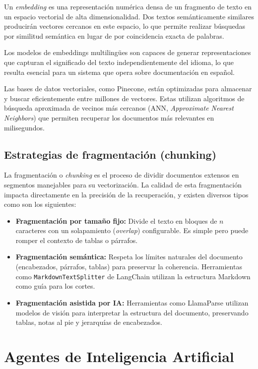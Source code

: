 \documentclass[12pt,a4paper,oneside]{report}
\begin{document}
Un \textit{embedding} es una representación numérica densa de un fragmento de texto en un espacio vectorial de alta dimensionalidad. Dos textos semánticamente similares producirán vectores cercanos en este espacio, lo que permite realizar búsquedas por similitud semántica en lugar de por coincidencia exacta de palabras.

Los modelos de embeddings multilingües son capaces de generar representaciones que capturan el significado del texto independientemente del idioma, lo que resulta esencial para un sistema que opera sobre documentación en español.

Las bases de datos vectoriales, como Pinecone, están optimizadas para almacenar y buscar eficientemente entre millones de vectores. Estas utilizan algoritmos de búsqueda aproximada de vecinos más cercanos (ANN, \textit{Approximate Nearest Neighbors}) que permiten recuperar los documentos más relevantes en milisegundos.

\subsection{Estrategias de fragmentación (chunking)}

La fragmentación o \textit{chunking} es el proceso de dividir documentos extensos en segmentos manejables para su vectorización. La calidad de esta fragmentación impacta directamente en la precisión de la recuperación, y existen diversos tipos como son los siguientes:

\begin{itemize}
    \item \textbf{Fragmentación por tamaño fijo:} Divide el texto en bloques de $n$ caracteres con un solapamiento (\textit{overlap}) configurable. Es simple pero puede romper el contexto de tablas o párrafos.
    \item \textbf{Fragmentación semántica:} Respeta los límites naturales del documento (encabezados, párrafos, tablas) para preservar la coherencia. Herramientas como \texttt{Mark\-down\-Text\-Split\-ter} de LangChain utilizan la estructura Markdown como guía para los cortes.
    \item \textbf{Fragmentación asistida por IA:} Herramientas como LlamaParse utilizan modelos de visión para interpretar la estructura del documento, preservando tablas, notas al pie y jerarquías de encabezados.
\end{itemize}

\section{Agentes de Inteligencia Artificial}
\end{document}

